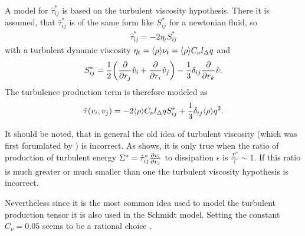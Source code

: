 A model for $\hat{\tau}^*_{ij}$ is based on the turbulent viscosity
hypothesis.
There it is assumed, that $\hat{\tau}^*_{ij}$ is of the same form like
$S^*_{ij}$ for a newtonian fluid, so
\begin{align}
\hat{\tau}^*_{ij}=- 2 \eta_t S^*_{ij}
\end{align}
with a turbulent dynamic viscosity
$\eta_t=\fil{\rho}\nu_t=\fil{\rho}C_{\nu}l_{\Delta} q$ and
\begin{align}
S^*_{ij}=\frac{1}{2}\lra{\pd{r_j}\hat{v}_i+\pd{r_i}\hat{v}_j}
-\frac{1}{3}\delta_{ij}\pd{r_k}\hat{v}.
\end{align}
The turbulence production term is therefore modeled as
\begin{align}
\hat{\tau}(v_i,v_j)=-2\fil{\rho}C_{\nu} l_{\Delta} q
S^*_{ij}+\frac{1}{3}\delta_{ij}\fil{\rho}q^2.
\end{align}

It should be noted, that in general the old idea of turbulent viscosity
(which was first forumlated by \citet{Boussinesq1877}) is
incorrect. As \citet{Pope2000} shows, it
is only true when the ratio of production of turbulent energy
$\Sigma^*=\hat{\tau}^*_{ij}\ppd{r_j}{v_i}$ to dissipation $\epsilon$ is
$\frac{\Sigma^*}{\epsilon}\sim 1$. If this ratio is much greater or much
smaller than one the turbulent viscosity hypothesis is incorrect. 

Nevertheless since it is the most common idea used to model the turbulent
production tensor it is also used in the Schmidt model. Setting the
constant $C_{\nu}=0.05$ seems to be a rational choice \citep{Schmidt2006}.

